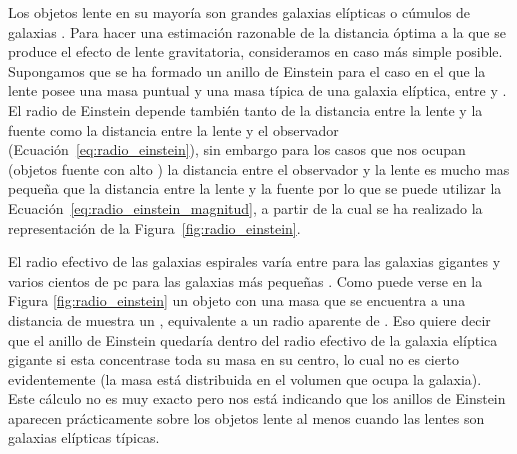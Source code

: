 Los objetos lente en su mayoría son grandes galaxias elípticas o cúmulos de galaxias \citep{article:Negrello_2010}. Para hacer una estimación razonable de la distancia óptima a la que se produce el efecto de lente gravitatoria, consideramos en caso más simple posible. Supongamos que se ha formado un anillo de Einstein para el caso en el que la lente posee una masa puntual y una masa típica de una galaxia elíptica, entre  y . El radio de Einstein depende también tanto de la distancia entre la lente y la fuente como la distancia entre la lente y el observador (Ecuación~\ref{eq:radio_einstein}), sin embargo para los casos que nos ocupan (objetos fuente con alto \rt) la distancia entre el observador y la lente es mucho mas pequeña que la distancia entre la lente y la fuente por lo que se puede utilizar la Ecuación~\ref{eq:radio_einstein_magnitud}, a partir de la cual se ha realizado la representación de la Figura~\ref{fig:radio_einstein}.

El radio efectivo de las galaxias espirales varía entre  para las galaxias gigantes y varios cientos de pc para las galaxias más pequeñas \citep{book:encyclopedia}. Como puede verse en la Figura \ref{fig:radio_einstein} un objeto con una masa  que se encuentra a una distancia de   muestra un , equivalente a un radio aparente de  . Eso quiere decir que el anillo de Einstein quedaría dentro del radio efectivo de la galaxia elíptica gigante si esta concentrase toda su masa en su centro, lo cual no es cierto evidentemente (la masa está distribuida en el volumen que ocupa la galaxia). Este cálculo no es muy exacto pero nos está indicando que los anillos de Einstein aparecen prácticamente sobre los objetos lente al menos cuando las lentes son galaxias elípticas típicas.

